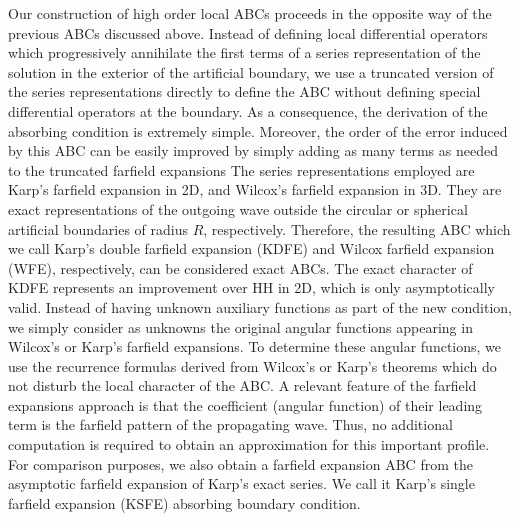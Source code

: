 \documentclass[final,3p,times,12pt]{elsarticle}
\begin{document}
Our construction of high order local ABCs proceeds in the opposite way of the  previous ABCs discussed above. Instead of defining local differential operators which progressively annihilate the first terms of a series representation of the solution in the exterior of the artificial boundary, we use a truncated version of the series representations directly to define the ABC without defining special differential operators at the boundary.  As a consequence, the derivation of the absorbing condition is extremely simple. Moreover, the order of the error induced by this ABC can be easily improved by simply adding as many terms as needed to the truncated farfield expansions 
The series representations employed are Karp's farfield expansion \cite{Karp} in 2D, and Wilcox's farfield expansion \cite{Wil-1956} in 3D. They are exact representations of the outgoing wave outside the circular or spherical artificial boundaries of radius $R$, respectively. Therefore, the resulting ABC which we call 
Karp's double farfield expansion (KDFE) and Wilcox farfield expansion (WFE), respectively, can be considered exact ABCs. The exact character of KDFE represents an improvement over HH in 2D, which is only asymptotically valid. Instead of having unknown auxiliary functions as part of the new condition, we simply consider as unknowns the original angular functions appearing in Wilcox's or Karp's farfield expansions. To determine these angular functions, we use the recurrence formulas derived from Wilcox's or Karp's theorems which do not disturb the local character of the ABC. A relevant feature of the farfield expansions approach is that the coefficient (angular function) of their leading term is the farfield pattern of the propagating wave. Thus, no additional computation is required to obtain an approximation for this important profile. For comparison purposes, we also obtain a farfield expansion ABC from the asymptotic farfield expansion of Karp's exact series. We call it Karp's single farfield expansion (KSFE) absorbing boundary condition. 
\end{document}
